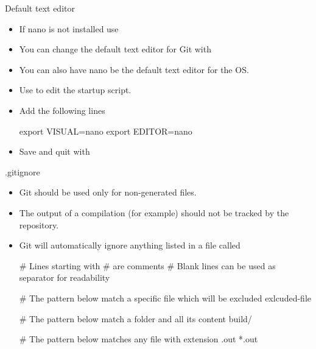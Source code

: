 \begin{frame}[fragile]{Default text editor \insertcontinuationtext}
    \begin{itemize}[<+->]
        \item If nano is not installed use 
        \item You can change the default text editor for Git with 
        \item You can also have nano be the default text editor for the OS.
        \item Use  to edit the startup script.
        \item Add the following lines
        \begin{codeblock}
    export VISUAL=nano
    export EDITOR=nano
        \end{codeblock}
        \item Save and quit with  
    \end{itemize}
\end{frame}

\begin{frame}[fragile]{.gitignore}
    \begin{itemize}[<+->]
        \item Git should be used only for non-generated files.
        \item The output of a compilation (for example) should not be tracked by the repository.
        \item Git will automatically ignore anything listed in a file called 
        \begin{codeblock}
# Lines starting with # are comments
# Blank lines can be used as separator for readability

# The pattern below match a specific file which will be excluded
exlcuded-file

# The pattern below match a folder and all its content
build/

# The pattern below matches any file with extension .out
*.out
        \end{codeblock}
    \end{itemize}
\end{frame}

